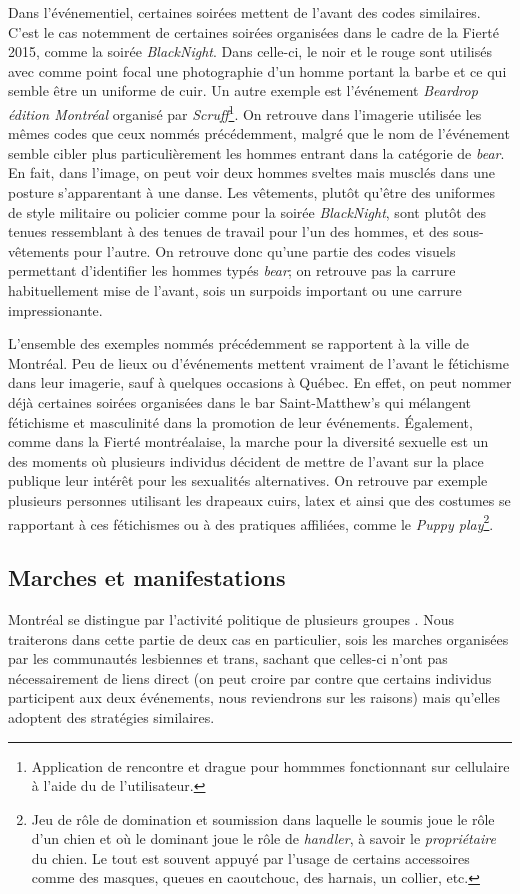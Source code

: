 Dans l'événementiel, certaines soirées mettent de l'avant des codes similaires.
C'est le cas notemment de certaines soirées organisées dans le cadre de la Fierté 2015, comme la soirée  \emph{BlackNight}.
Dans celle-ci, le noir et le rouge sont utilisés avec comme point focal une photographie d'un homme portant la barbe et ce qui semble être un uniforme de cuir.
Un autre exemple est l'événement \emph{Beardrop édition Montréal} organisé par \emph{Scruff}\footnote{Application de rencontre et drague pour hommmes fonctionnant sur cellulaire à l'aide du \gps{} de l'utilisateur.}.
On retrouve dans l'imagerie utilisée les mêmes codes que ceux nommés précédemment, malgré que le nom de l'événement semble cibler plus particulièrement les hommes entrant dans la catégorie de \emph{bear}.
En fait, dans l'image, on peut voir deux hommes sveltes mais musclés dans une posture s'apparentant à une danse.
Les vêtements, plutôt qu'être des uniformes de style militaire ou policier comme pour la soirée \emph{BlackNight}, sont plutôt des tenues ressemblant à des tenues de travail pour l'un des hommes, et des sous-vêtements pour l'autre.
On retrouve donc qu'une partie des codes visuels permettant d'identifier les hommes typés \emph{bear}; on retrouve pas la carrure habituellement mise de l'avant, sois un surpoids important ou une carrure impressionante.

L'ensemble des exemples nommés précédemment se rapportent à la ville de Montréal.
Peu de lieux ou d'événements mettent vraiment de l'avant le fétichisme dans leur imagerie, sauf à quelques occasions à Québec.
En effet, on peut nommer déjà certaines soirées organisées dans le bar Saint-Matthew's qui mélangent fétichisme et masculinité dans la promotion de leur événements.
Également, comme dans la Fierté montréalaise, la marche pour la diversité sexuelle est un des moments où plusieurs individus décident de mettre de l'avant sur la place publique leur intérêt pour les sexualités alternatives.
On retrouve par exemple plusieurs personnes utilisant les drapeaux cuirs, latex et \bdsm{} ainsi que des costumes se rapportant à ces fétichismes ou à des pratiques affiliées, comme le \emph{Puppy play}\footnote{Jeu de rôle de domination et soumission dans laquelle le soumis joue le rôle d'un chien  et où le dominant joue le rôle de \emph{handler}, à savoir le \emph{propriétaire} du chien. Le tout est souvent appuyé par l'usage de certains accessoires comme des masques, queues en caoutchouc, des harnais, un collier, etc.}.

\subsection{Marches et manifestations}
\label{subsec:label}
 Montréal se distingue par l'activité politique de plusieurs groupes \lgbt{}.
Nous traiterons dans cette partie de deux cas en particulier, sois les marches organisées par les communautés lesbiennes et trans, sachant que celles-ci n'ont pas nécessairement de liens direct (on peut croire par contre que certains individus participent aux deux événements, nous reviendrons sur les raisons) mais qu'elles adoptent des stratégies similaires.

